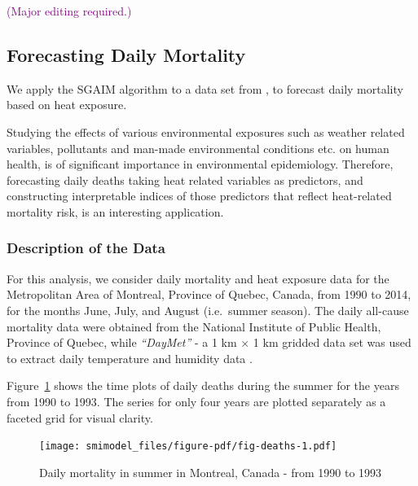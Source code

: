 \documentclass[11pt,a4paper,]{article}
\begin{document}
\textcolor{purple}{(Major editing required.)}

\hypertarget{forecasting-daily-mortality}{%
\subsection{Forecasting Daily
Mortality}\label{forecasting-daily-mortality}}

We apply the SGAIM algorithm to a data set from \textcite{Masselot2022},
to forecast daily mortality based on heat exposure.

Studying the effects of various environmental exposures such as weather
related variables, pollutants and man-made environmental conditions etc.
on human health, is of significant importance in environmental
epidemiology. Therefore, forecasting daily deaths taking heat related
variables as predictors, and constructing interpretable indices of those
predictors that reflect heat-related mortality risk, is an interesting
application.

\hypertarget{description-of-the-data}{%
\subsubsection{Description of the Data}\label{description-of-the-data}}

For this analysis, we consider daily mortality and heat exposure data
for the Metropolitan Area of Montreal, Province of Quebec, Canada, from
1990 to 2014, for the months June, July, and August (i.e.~summer
season). The daily all-cause mortality data were obtained from the
National Institute of Public Health, Province of Quebec, while
\emph{``DayMet''} - a 1 km × 1 km gridded data set
\autocite{Thornton2021} was used to extract daily temperature and
humidity data \autocite{Masselot2022}.

Figure~\ref{fig-deaths} shows the time plots of daily deaths during the
summer for the years from 1990 to 1993. The series for only four years
are plotted separately as a faceted grid for visual clarity.

\begin{figure}

{\centering \texttt{[image: smimodel\_files/figure-pdf/fig-deaths-1.pdf]}

}

\caption{\label{fig-deaths}Daily mortality in summer in Montreal, Canada
- from 1990 to 1993}

\end{figure}
\end{document}
